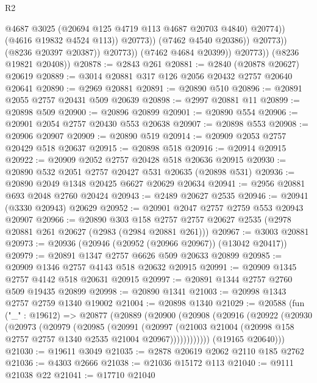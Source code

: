 \begin{lexlean}{R2}
\begin{coremodule}
                                  @4687
                                  @3025
                                  (@20694 @125 @4719 @113 @4687 @20703 @4840)
                                  @20774))
                              (@4616 @19832 @4524 @113))
                            @20773))
                        (@7462 @4540 @20386))
                      @20773))
                  (@8236 @20397 @20387))
                @20773))
            (@7462 @4684 @20399))
          @20773))
      (@8236 @19821 @20408))
@20878 := @2843 @261
@20881 := @2840 (@20878 @20627) @20619
@20889 := @3014 @20881 @317 @126 @2056 @20432 @2757 @20640 @20641
@20890 := @2969 @20881
@20891 := @20890 @510
@20896 := @20891 @2055 @2757 @20431 @509 @20639
@20898 := @2997 @20881 @11
@20899 := @20898 @509
@20900 := @20896 @20899
@20901 := @20890 @554
@20906 := @20901 @2054 @2757 @20430 @553 @20638
@20907 := @20898 @553
@20908 := @20906 @20907
@20909 := @20890 @519
@20914 := @20909 @2053 @2757 @20429 @518 @20637
@20915 := @20898 @518
@20916 := @20914 @20915
@20922 := @20909 @2052 @2757 @20428 @518 @20636 @20915
@20930 := @20890 @532 @2051 @2757 @20427 @531 @20635 (@20898 @531)
@20936 := @20890 @2049 @1348 @20425 @6627 @20629 @20634
@20941 := @2956 @20881 @693 @2048 @2760 @20424
@20943 := @2489 @20627 @2535
@20946 := @20941 (@3330 @20943) @20629
@20952 := @20901 @2047 @2757 @2759 @553 @20943 @20907
@20966 := @20890
    @303
    @158
    @2757
    @2757
    @20627
    @2535
    (@2978 @20881 @261 @20627 (@2983 (@2984 @20881 @261)))
@20967 := @3003 @20881
@20973 := @20936 (@20946 (@20952 (@20966 @20967)) (@13042 @20417))
@20979 := @20891 @1347 @2757 @6626 @509 @20633 @20899
@20985 := @20909 @1346 @2757 @4143 @518 @20632 @20915
@20991 := @20909 @1345 @2757 @4142 @518 @20631 @20915
@20997 := @20891 @1344 @2757 @2760 @509 @19435 @20899
@20998 := @20890 @1341
@21003 := @20998 @1343 @2757 @2759 @1340 @19002
@21004 := @20898 @1340
@21029 := @20588
    (fun ("_" : @19612) =>
    @20877
      (@20889
        (@20900
          (@20908
            (@20916
              (@20922
                (@20930
                  (@20973
                    (@20979
                      (@20985
                        (@20991
                          (@20997
                            (@21003
                              @21004
                              (@20998 @158 @2757 @2757 @1340 @2535 @21004 @20967))))))))))))
        (@19165 @20640)))
@21030 := @19611 @3049
@21035 := @2878 @20619 @2062 @2110 @185 @2762
@21036 := @4303 @2666
@21038 := @21036 @15172 @113
@21040 := @9111 @21038 @22
@21041 := @17710 @21040

\end{coremodule}
\end{lexlean}
